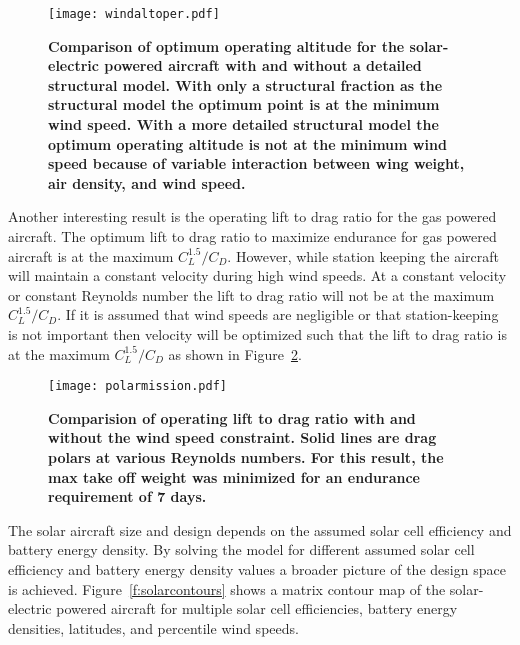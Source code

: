 \documentclass[]{aiaa-tc}%
\begin{document}
\begin{figure}[H]
	\begin{center}
	\texttt{[image: windaltoper.pdf]}
 \caption{\textbf{Comparison of optimum operating altitude for the solar-electric powered aircraft with and without a detailed structural model.  With only a structural fraction as the structural model the optimum point is at the minimum wind speed.  With a more detailed structural model the optimum operating altitude is not at the minimum wind speed because of variable interaction between wing weight, air density, and wind speed.}}
 \label{f:altoper}
	\end{center}
\end{figure}

Another interesting result is the operating lift to drag ratio for the gas powered aircraft.  
The optimum lift to drag ratio to maximize endurance for gas powered aircraft is at the maximum $C_L^{1.5}/C_D$.\cite{br2}  
However, while station keeping the aircraft will maintain a constant velocity during high wind speeds.  
At a constant velocity or constant Reynolds number the lift to drag ratio will not be at the maximum $C_L^{1.5}/C_D$.  
If it is assumed that wind speeds are negligible or that station-keeping is not important then velocity will be optimized such that the lift to drag ratio is at the maximum $C_L^{1.5}/C_D$ as shown in Figure~\ref{f:polarmission}.

\begin{figure}[H]
	\begin{center}
	\texttt{[image: polarmission.pdf]}
    \caption{\textbf{Comparision of operating lift to drag ratio with and without the wind speed constraint. Solid lines are drag polars at various Reynolds numbers.  For this result, the max take off weight was minimized for an endurance requirement of 7 days.}}
 \label{f:polarmission}
	\end{center}
\end{figure}

The solar aircraft size and design depends on the assumed solar cell efficiency and battery energy density. 
By solving the model for different assumed solar cell efficiency and battery energy density values a broader picture of the design space is achieved.   
Figure~\ref{f:solarcontours} shows a matrix contour map of the solar-electric powered aircraft for multiple solar cell efficiencies, battery energy densities, latitudes, and percentile wind speeds.
\end{document}

